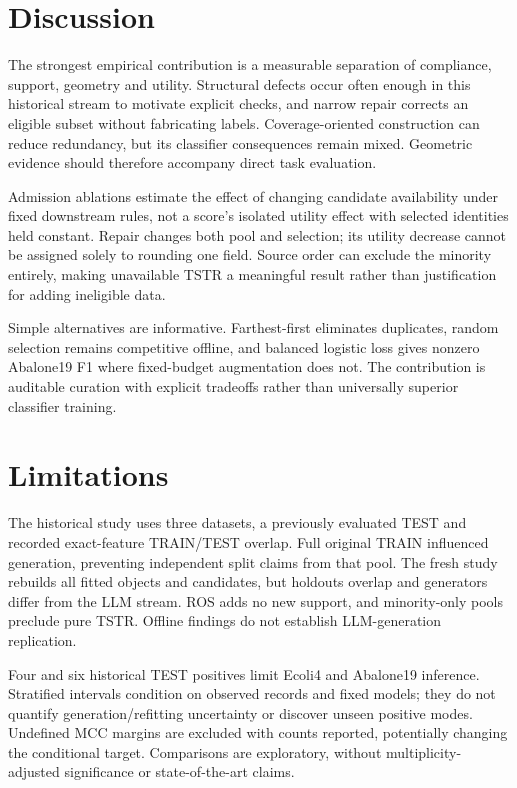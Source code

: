 \section{Discussion}
The strongest empirical contribution is a measurable separation of compliance, support, geometry and utility. Structural defects occur often enough in this historical stream to motivate explicit checks, and narrow repair corrects an eligible subset without fabricating labels. Coverage-oriented construction can reduce redundancy, but its classifier consequences remain mixed. Geometric evidence should therefore accompany direct task evaluation.

Admission ablations estimate the effect of changing candidate availability under fixed downstream rules, not a score's isolated utility effect with selected identities held constant. Repair changes both pool and selection; its utility decrease cannot be assigned solely to rounding one field. Source order can exclude the minority entirely, making unavailable TSTR a meaningful result rather than justification for adding ineligible data.

Simple alternatives are informative. Farthest-first eliminates duplicates, random selection remains competitive offline, and balanced logistic loss gives nonzero Abalone19 F1 where fixed-budget augmentation does not. The contribution is auditable curation with explicit tradeoffs rather than universally superior classifier training.

\section{Limitations}
The historical study uses three datasets, a previously evaluated TEST and recorded exact-feature TRAIN/TEST overlap. Full original TRAIN influenced generation, preventing independent split claims from that pool. The fresh study rebuilds all fitted objects and candidates, but holdouts overlap and generators differ from the LLM stream. ROS adds no new support, and minority-only pools preclude pure TSTR. Offline findings do not establish LLM-generation replication.

Four and six historical TEST positives limit Ecoli4 and Abalone19 inference. Stratified intervals condition on observed records and fixed models; they do not quantify generation/refitting uncertainty or discover unseen positive modes. Undefined MCC margins are excluded with counts reported, potentially changing the conditional target. Comparisons are exploratory, without multiplicity-adjusted significance or state-of-the-art claims.

